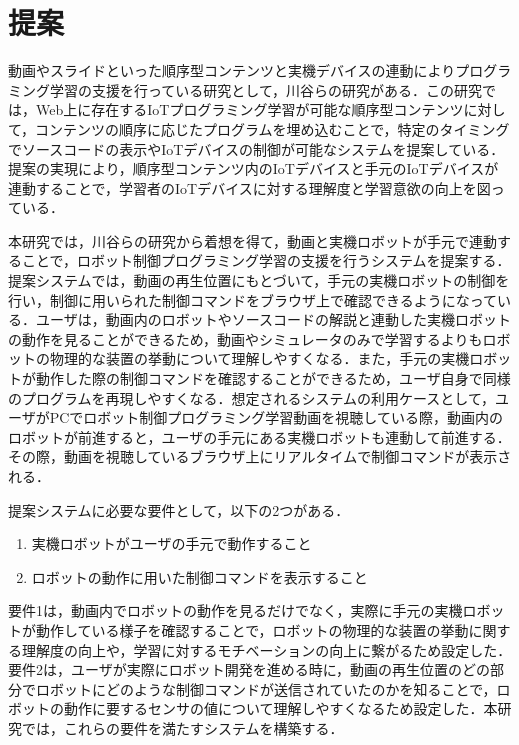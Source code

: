 \documentclass{ujarticle}
\begin{document}
\section{提案}
動画やスライドといった順序型コンテンツと実機デバイスの連動によりプログラミング学習の支援を行っている研究として，川谷らの研究\cite{Kawatani}がある．この研究では，Web上に存在するIoTプログラミング学習が可能な順序型コンテンツに対して，コンテンツの順序に応じたプログラムを埋め込むことで，特定のタイミングでソースコードの表示やIoTデバイスの制御が可能なシステムを提案している．提案の実現により，順序型コンテンツ内のIoTデバイスと手元のIoTデバイスが連動することで，学習者のIoTデバイスに対する理解度と学習意欲の向上を図っている．
\par 本研究では，川谷らの研究から着想を得て，動画と実機ロボットが手元で連動することで，ロボット制御プログラミング学習の支援を行うシステムを提案する．提案システムでは，動画の再生位置にもとづいて，手元の実機ロボットの制御を行い，制御に用いられた制御コマンドをブラウザ上で確認できるようになっている．ユーザは，動画内のロボットやソースコードの解説と連動した実機ロボットの動作を見ることができるため，動画やシミュレータのみで学習するよりもロボットの物理的な装置の挙動について理解しやすくなる．また，手元の実機ロボットが動作した際の制御コマンドを確認することができるため，ユーザ自身で同様のプログラムを再現しやすくなる．想定されるシステムの利用ケースとして，ユーザがPCでロボット制御プログラミング学習動画を視聴している際，動画内のロボットが前進すると，ユーザの手元にある実機ロボットも連動して前進する．その際，動画を視聴しているブラウザ上にリアルタイムで制御コマンドが表示される．
\par 提案システムに必要な要件として，以下の2つがある．

\begin{enumerate}
  \item 実機ロボットがユーザの手元で動作すること
  \item ロボットの動作に用いた制御コマンドを表示すること
\end{enumerate}

要件1は，動画内でロボットの動作を見るだけでなく，実際に手元の実機ロボットが動作している様子を確認することで，ロボットの物理的な装置の挙動に関する理解度の向上や，学習に対するモチベーションの向上に繋がるため設定した．要件2は，ユーザが実際にロボット開発を進める時に，動画の再生位置のどの部分でロボットにどのような制御コマンドが送信されていたのかを知ることで，ロボットの動作に要するセンサの値について理解しやすくなるため設定した．本研究では，これらの要件を満たすシステムを構築する．
\end{document}
